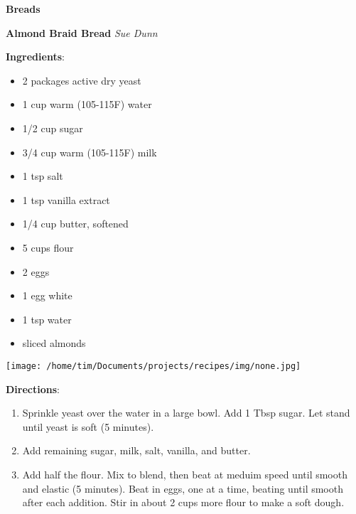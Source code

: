 \documentclass[11pt, twoside, openany]{book}
\begin{document}
{\newpage \LARGE \textbf{Breads}} \label{breads}\vspace{4mm}\\
\noindent\begin{minipage}[t]{\linewidth}%
{\Large\textbf{Almond Braid Bread}} \label{almond-braid-bread}\hfill\textit{Sue Dunn}\\
\noindent\begin{minipage}[t]{0.78\linewidth}%
\textbf{Ingredients}:\vspace{-3mm}
\begin{multicols}{2}
\begin{itemize}\setlength\itemsep{-1mm}
\item 2 packages active dry yeast
\item 1 cup warm (105-115F) water
\item 1/2 cup sugar
\item 3/4 cup warm (105-115F) milk
\item 1 tsp salt
\item 1 tsp vanilla extract
\item 1/4 cup butter, softened
\item 5 cups flour
\item 2 eggs
\item 1 egg white
\item 1 tsp water
\item sliced almonds
\end{itemize}
\end{multicols}
\end{minipage}
\noindent\begin{minipage}[t]{0.18\linewidth}
\centering \strut\vspace*{-\baselineskip}\newline
\texttt{[image: /home/tim/Documents/projects/recipes/img/none.jpg]}\\
\end{minipage}\vspace{3mm}
\textbf{Directions}:
\vspace{-3mm}\begin{enumerate}\setlength\itemsep{-1mm}
\item Sprinkle yeast over the water in a large bowl. Add 1 Tbsp sugar. Let stand until yeast is soft (5 minutes).
\item Add remaining sugar, milk, salt, vanilla, and butter.
\item Add half the flour. Mix to blend, then beat at meduim speed until smooth and elastic (5 minutes). Beat in eggs, one at a time, beating until smooth after each addition. Stir in about 2 cups more flour to make a soft dough.

\end{enumerate}
\end{minipage}
\end{document}
